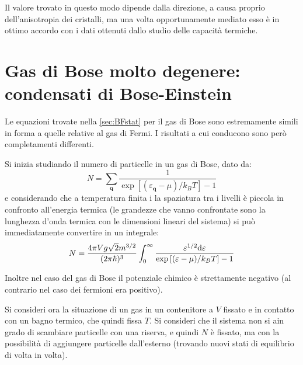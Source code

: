 Il valore trovato in questo modo dipende dalla direzione, a causa proprio dell'anisotropia dei cristalli, ma una volta opportunamente mediato esso è in ottimo accordo con i dati ottenuti dallo studio delle capacità termiche.

\section{Gas di Bose molto degenere: condensati di Bose-Einstein}

Le equazioni trovate nella \cref{sec:BFstat} per il gas di Bose sono estremamente simili in forma a quelle relative al gas di Fermi. I risultati a cui conducono sono però completamenti differenti.
\newline

Si inizia studiando il numero di particelle in un gas di Bose, dato da:
\begin{equation*}
N = \sum_{\textbf{q}}  \frac{1}{ \exp\left[(\varepsilon_{\textbf{q}} - \mu)/k_B T\right] - 1}
\end{equation*}
e considerando che a temperatura finita i la spaziatura tra i livelli è piccola in confronto all'energia termica (le grandezze che vanno confrontate sono la lunghezza d'onda termica con le dimensioni lineari del sistema) si può immediatamente convertire in un integrale:
\begin{equation*}
N =  \frac{4\pi V g \sqrt{2} m^{3/2}}{(2\pi \hbar)^3} \int_{0}^{\infty}  \frac{\varepsilon^{1/2} \dd \varepsilon}{ \exp\left[(\varepsilon - \mu)/k_B T\right] - 1}
\end{equation*}

Inoltre nel caso del gas di Bose il potenziale chimico è strettamente negativo (al contrario nel caso dei fermioni era positivo).

Si consideri ora la situazione di un gas in un contenitore a  $V$ fissato e in contatto con un bagno termico, che quindi fissa $ T $. Si consideri che il sistema non si ain grado di scambiare particelle con una riserva, e quindi $N$ è fissato, ma con la possibilità di aggiungere particelle dall'esterno (trovando nuovi stati di equilibrio di volta in volta).


